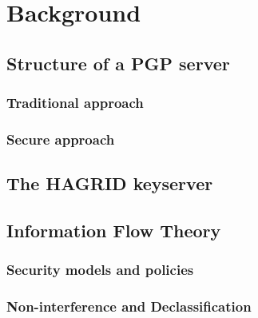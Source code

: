 \section{Background}


\subsection{Structure of a PGP server}
\newpage

\subsubsection{Traditional approach}

\subsubsection{Secure approach}
\newpage

\subsection{The HAGRID keyserver}
\newpage

\subsection{Information Flow Theory}

\subsubsection{Security models and policies}
\subsubsection{Non-interference and Declassification}
\newpage
